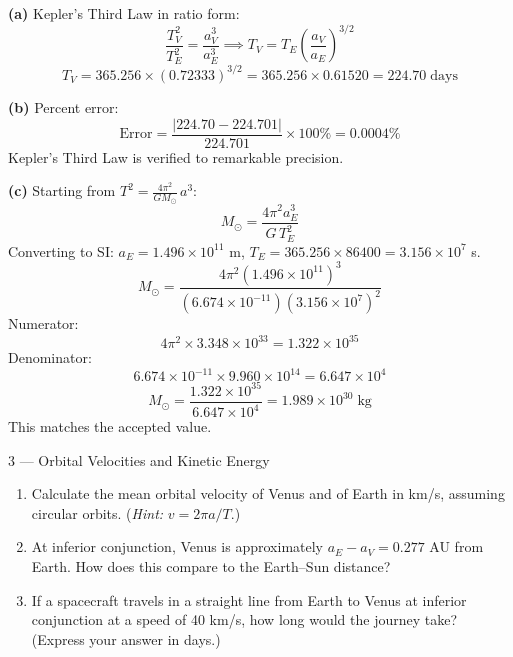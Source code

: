 \documentclass[11pt,letterpaper]{article}
\begin{document}
\begin{solution}
\textbf{(a)} Kepler's Third Law in ratio form:
\[
  \frac{T_V^2}{T_E^2} = \frac{a_V^3}{a_E^3}
  \implies T_V = T_E \left(\frac{a_V}{a_E}\right)^{3/2}
\]
\[
  T_V = 365.256 \times (0.72333)^{3/2}
  = 365.256 \times 0.61520
  = \boxed{224.70\;\text{days}}
\]

\textbf{(b)} Percent error:
\[
  \text{Error} = \frac{|224.70 - 224.701|}{224.701} \times 100\%
  = \boxed{0.0004\%}
\]
Kepler's Third Law is verified to remarkable precision.

\textbf{(c)} Starting from $T^2 = \frac{4\pi^2}{GM_\odot}\,a^3$:
\[
  M_\odot = \frac{4\pi^2 a_E^3}{G\,T_E^2}
\]
Converting to SI: $a_E = 1.496 \times 10^{11}$ m,
$T_E = 365.256 \times 86400 = 3.156 \times 10^7$ s.
\[
  M_\odot = \frac{4\pi^2 (1.496 \times 10^{11})^3}
  {(6.674 \times 10^{-11})(3.156 \times 10^7)^2}
\]
Numerator:
\[
  4\pi^2 \times 3.348 \times 10^{33}
  = 1.322 \times 10^{35}
\]
Denominator:
\[
  6.674 \times 10^{-11} \times 9.960 \times 10^{14}
  = 6.647 \times 10^{4}
\]
\[
  M_\odot = \frac{1.322 \times 10^{35}}{6.647 \times 10^{4}}
  = \boxed{1.989 \times 10^{30}\;\text{kg}}
\]
This matches the accepted value.
\end{solution}

\vspace{0.5cm}

\begin{problem}{3 — Orbital Velocities and Kinetic Energy}
\begin{enumerate}[label=(\alph*)]
  \item Calculate the mean orbital velocity of Venus and of Earth
    in km/s, assuming circular orbits. (\textit{Hint:}
    $v = 2\pi a / T$.)
  \item At inferior conjunction, Venus is approximately
    $a_E - a_V = 0.277$ AU from Earth. How does this compare to the
    Earth–Sun distance?
  \item If a spacecraft travels in a straight line from Earth to
    Venus at inferior conjunction at a speed of 40 km/s, how long
    would the journey take? (Express your answer in days.)
\end{enumerate}
\end{problem}
\end{document}
